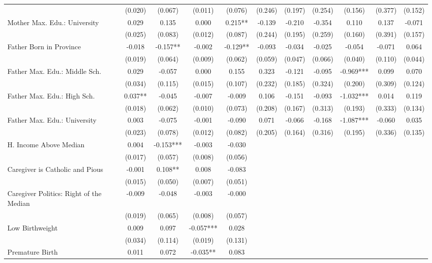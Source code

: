 \begin{tabular}{lcccccccccc}
 & (0.020) & (0.067) & (0.011) & (0.076) & (0.246) & (0.197) & (0.254) & (0.156) & (0.377) & (0.152) \\
Mother Max. Edu.: University & 0.029 & 0.135 & 0.000 & 0.215** & -0.139 & -0.210 & -0.354 & 0.110 & 0.137 & -0.071 \\
 & (0.025) & (0.083) & (0.012) & (0.087) & (0.244) & (0.195) & (0.259) & (0.160) & (0.391) & (0.157) \\
Father Born in Province & -0.018 & -0.157** & -0.002 & -0.129** & -0.093 & -0.034 & -0.025 & -0.054 & -0.071 & 0.064 \\
 & (0.019) & (0.064) & (0.009) & (0.062) & (0.059) & (0.047) & (0.066) & (0.040) & (0.110) & (0.044) \\
Father Max. Edu.: Middle Sch. & 0.029 & -0.057 & 0.000 & 0.155 & 0.323 & -0.121 & -0.095 & -0.969*** & 0.099 & 0.070 \\
 & (0.034) & (0.115) & (0.015) & (0.107) & (0.232) & (0.185) & (0.324) & (0.200) & (0.309) & (0.124) \\
Father Max. Edu.: High Sch. & 0.037** & -0.045 & -0.007 & -0.009 & 0.106 & -0.151 & -0.093 & -1.032*** & 0.014 & 0.119 \\
 & (0.018) & (0.062) & (0.010) & (0.073) & (0.208) & (0.167) & (0.313) & (0.193) & (0.333) & (0.134) \\
Father Max. Edu.: University & 0.003 & -0.075 & -0.001 & -0.090 & 0.071 & -0.066 & -0.168 & -1.087*** & -0.060 & 0.035 \\
 & (0.023) & (0.078) & (0.012) & (0.082) & (0.205) & (0.164) & (0.316) & (0.195) & (0.336) & (0.135) \\
H. Income Above Median & 0.004 & -0.153*** & -0.003 & -0.030 &  &  &  &  &  &  \\
 & (0.017) & (0.057) & (0.008) & (0.056) &  &  &  &  &  &  \\
Caregiver is Catholic and Pious & -0.001 & 0.108** & 0.008 & -0.083 &  &  &  &  &  &  \\
 & (0.015) & (0.050) & (0.007) & (0.051) &  &  &  &  &  &  \\
Caregiver Politics: Right of the Median & -0.009 & -0.048 & -0.003 & -0.000 &  &  &  &  &  &  \\
 & (0.019) & (0.065) & (0.008) & (0.057) &  &  &  &  &  &  \\
Low Birthweight & 0.009 & 0.097 & -0.057*** & 0.028 &  &  &  &  &  &  \\
 & (0.034) & (0.114) & (0.019) & (0.131) &  &  &  &  &  &  \\
Premature Birth & 0.011 & 0.072 & -0.035** & 0.083 &  &  &  &  &  &  \\

\end{tabular}
